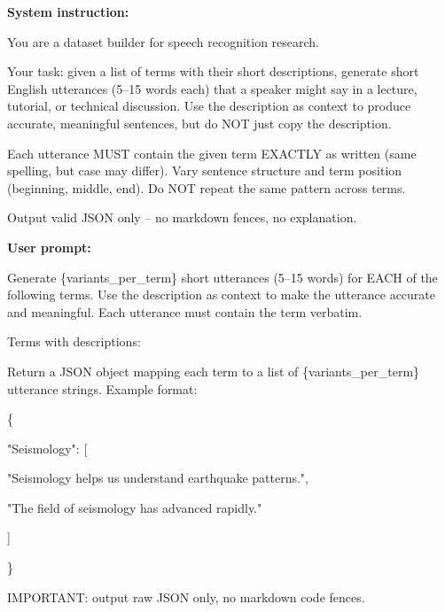 \begin{tcolorbox}[
    enhanced,
    breakable,
    colback=gray!3,
    colframe=gray!55!black,
    title={Prompt template for Wikidata term utterance generation},
    fonttitle=\bfseries,
    boxrule=0.4pt,
    arc=1mm,
    left=1.5mm,
    right=1.5mm,
    top=1mm,
    bottom=1mm
]
{\ttfamily\footnotesize
\textbf{System instruction:}\par
You are a dataset builder for speech recognition research.\par
Your task: given a list of terms with their short descriptions, generate short English utterances (5--15 words each) that a speaker might say in a lecture, tutorial, or technical discussion. Use the description as context to produce accurate, meaningful sentences, but do NOT just copy the description.\par
Each utterance MUST contain the given term EXACTLY as written (same spelling, but case may differ). Vary sentence structure and term position (beginning, middle, end). Do NOT repeat the same pattern across terms.\par
Output valid JSON only -- no markdown fences, no explanation.\par
\vspace{0.5em}
\textbf{User prompt:}\par
Generate \{variants\_per\_term\} short utterances (5--15 words) for EACH of the following terms. Use the description as context to make the utterance accurate and meaningful. Each utterance must contain the term verbatim.\par
\vspace{0.5em}
Terms with descriptions:\par
[\par
\hspace*{1em}\{"term": "Seismology", "description": "scientific study of earthquakes"\},\par
\hspace*{1em}\{"term": "dataflow graph", "description": "graph representation of data dependencies"\}\par
]\par
\vspace{0.5em}
Return a JSON object mapping each term to a list of \{variants\_per\_term\} utterance strings. Example format:\par
\{\par
\hspace*{1em}"Seismology": [\par
\hspace*{2em}"Seismology helps us understand earthquake patterns.",\par
\hspace*{2em}"The field of seismology has advanced rapidly."\par
\hspace*{1em}]\par
\}\par
\vspace{0.5em}
IMPORTANT: output raw JSON only, no markdown code fences.\par
}
\end{tcolorbox}


